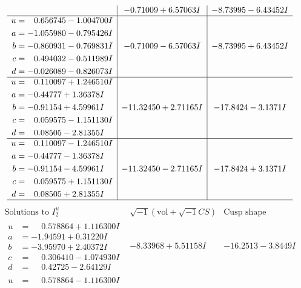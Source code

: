 \documentclass[1p]{elsarticle_modified}
\theoremstyle{definition}
\newcommand{\I}{\sqrt{-1}}
\begin{document}
$$\begin{array}{c|c|c}
 & -0.71009 + 6.57063 I & -8.73995 - 6.43452 I \\ \hline\begin{aligned}
u &= \phantom{-}0.656745 - 1.004700 I \\
a &= -1.055980 - 0.795426 I \\
b &= -0.860931 - 0.769831 I \\
c &= \phantom{-}0.494032 - 0.511989 I \\
d &= -0.026089 - 0.826073 I\end{aligned}
 & -0.71009 - 6.57063 I & -8.73995 + 6.43452 I \\ \hline\begin{aligned}
u &= \phantom{-}0.110097 + 1.246510 I \\
a &= -0.44777 + 1.36378 I \\
b &= -0.91154 + 4.59961 I \\
c &= \phantom{-}0.059575 - 1.151130 I \\
d &= \phantom{-}0.08505 - 2.81355 I\end{aligned}
 & -11.32450 + 2.71165 I & -17.8424 - 3.1371 I \\ \hline\begin{aligned}
u &= \phantom{-}0.110097 - 1.246510 I \\
a &= -0.44777 - 1.36378 I \\
b &= -0.91154 - 4.59961 I \\
c &= \phantom{-}0.059575 + 1.151130 I \\
d &= \phantom{-}0.08505 + 2.81355 I\end{aligned}
 & -11.32450 - 2.71165 I & -17.8424 + 3.1371 I\\
 \hline 
 \end{array}$$\newpage$$\begin{array}{c|c|c}  
\text{Solutions to }I^u_{2}& \I (\text{vol} + \sqrt{-1}CS) & \text{Cusp shape}\\
 \hline 
\begin{aligned}
u &= \phantom{-}0.578864 + 1.116300 I \\
a &= -1.94591 + 0.31220 I \\
b &= -3.95970 + 2.40372 I \\
c &= \phantom{-}0.306410 - 1.074930 I \\
d &= \phantom{-}0.42725 - 2.64129 I\end{aligned}
 & -8.33968 + 5.51158 I & -16.2513 - 3.8449 I \\ \hline\begin{aligned}
u &= \phantom{-}0.578864 - 1.116300 I \\

\end{aligned}
\end{array}$$
\end{document}
